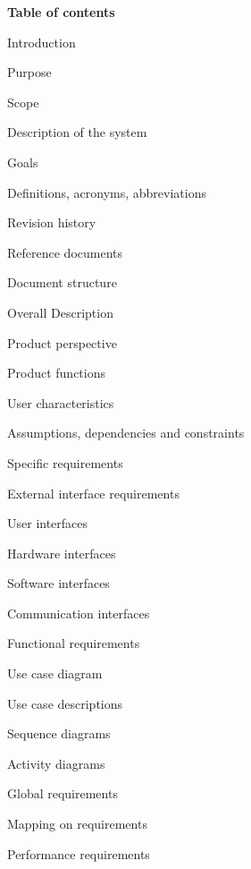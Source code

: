 \documentclass{article}
\begin{document}
\newpage
\textbf{Table of contents}
	\begin{legal}
 	\item Introduction
  		\begin{legal}
    	\item Purpose
		\item Scope
			\begin{legal}
			\item Description of the system
			\item Goals
			\end{legal}
		\item Definitions, acronyms, abbreviations
		\item Revision history
		\item Reference documents
		\item Document structure	
  		\end{legal}
	\item Overall Description
  		\begin{legal}
    	\item Product perspective
		\item Product functions
		\item User characteristics
		\item Assumptions, dependencies and constraints
  		\end{legal}
	\item Specific requirements
  		\begin{legal}
    		\item External interface requirements
			\begin{legal}
			\item User interfaces
			\item Hardware interfaces
			\item Software interfaces
			\item Communication interfaces
	  		\end{legal}
		\item Functional requirements
			\begin{legal}
			\item Use case diagram
			\item Use case descriptions
			\item Sequence diagrams
			\item Activity diagrams
			\item Global requirements
			\item Mapping on requirements
			\end{legal}
		\item Performance requirements

\end{legal}
\end{legal}
\end{document}
